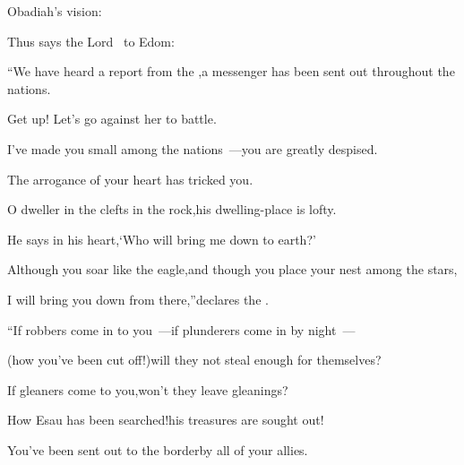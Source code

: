 
\begin{inparaenum}
  \hfil{} Obadiah's vision:\hfil%

  \smallskip\pa{}Thus says the Lord \god\ to Edom:%

  \pb{}``We have heard a report from the \lord,\pa{}a messenger has been sent out throughout the nations.%

  \pb{}Get up! Let's go against her to battle.%

  \pa{} I've made you small among the nations~---\pa{}you are greatly despised.%

  \pa{} The arrogance of your heart has tricked you.%

  \pb{}O dweller in the clefts in the rock,\pa{}his dwelling-place is lofty.%

  \pb{}He says in his heart,\pa{}`Who will bring me down to earth?'%

  \pa{} Although you soar like the eagle,\pa{}and though you place your nest among the stars,%

  \pb{}I will bring you down from there,''\pa{}declares the \lord.%

  \pb{} ``If robbers come in to you~---\pa{}if plunderers come in by night~---%

  \pc{}(how you've been cut off!)\pa{}will they not steal enough for themselves?%

  \pc{}If gleaners come to you,\pa{}won't they leave gleanings?%

  \pb{} How Esau has been searched!\pa{}his treasures are sought out!%

  \pb{} You've been sent out to the border\pa{}by all of your allies.%


\end{inparaenum}
